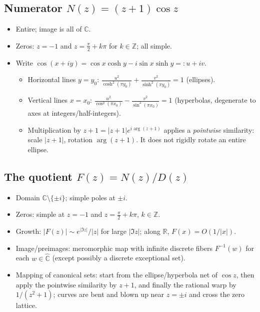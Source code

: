 \documentclass[12pt,a4paper]{article}
\newcommand{\C}{\mathbb{C}}
\newcommand{\R}{\mathbb{R}}
\begin{document}
\subsection*{Numerator \(N(z)=(z+1)\cos z\)}
\begin{itemize}
	\item Entire; image is all of \(\C\).
	\item Zeros: \(z=-1\) and \(z=\tfrac{\pi}{2}+k\pi\) for \(k\in\mathbb Z\); all simple.
	\item Write \(\cos(x+iy)=\cos x\cosh y - i\sin x\sinh y =: u+iv\).
	\begin{itemize}
		\item Horizontal lines \(y=y_{0}\): \(\displaystyle \frac{u^{2}}{\cosh^{2}(\pi y_{0})}+\frac{v^{2}}{\sinh^{2}(\pi y_{0})}=1\) (ellipses).
		\item Vertical lines \(x=x_{0}\): \(\displaystyle \frac{u^{2}}{\cos^{2}(\pi x_{0})}-\frac{v^{2}}{\sin^{2}(\pi x_{0})}=1\) (hyperbolas, degenerate to axes at integers/half-integers).
		\item Multiplication by \(z+1=|z+1|e^{i\arg(z+1)}\) applies a \emph{pointwise} similarity: scale \(|z+1|\), rotation \(\arg(z+1)\). It does not rigidly rotate an entire ellipse.
	\end{itemize}
\end{itemize}

\subsection*{The quotient \(F(z)=N(z)/D(z)\)}
\begin{itemize}
	\item Domain \(\C\setminus\{\pm i\}\); simple poles at \(\pm i\).
	\item Zeros: simple at \(z=-1\) and \(z=\tfrac{\pi}{2}+k\pi\), \(k\in\mathbb Z\).
	\item Growth: \(|F(z)|\sim e^{|\Im z|}/|z|\) for large \(|\Im z|\); along \(\R\), \(F(x)=O(1/|x|)\).
	\item Image/preimages: meromorphic map with infinite discrete fibers \(F^{-1}(w)\) for each \(w\in\widehat{\C}\) (except possibly a discrete exceptional set).
	\item Mapping of canonical sets: start from the ellipse/hyperbola net of \(\cos z\), then apply the pointwise similarity by \(z+1\), and finally the rational warp by \(1/(z^{2}+1)\); curves are bent and blown up near \(z=\pm i\) and cross the zero lattice.
\end{itemize}
\end{document}
